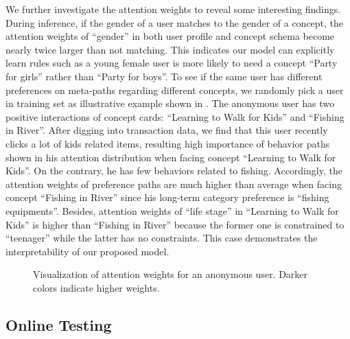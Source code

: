 We further investigate the attention weights to reveal some interesting findings.
During inference, if the gender of a user matches to the gender of a concept, the attention weights of ``gender'' in both user profile and concept schema become nearly twice larger than not matching.
This indicates our model can explicitly learn rules such as a young female user is more likely to need a concept ``Party for girls'' rather than ``Party for boys''.
To see if the same user has different preferences on meta-paths regarding different concepts, we randomly pick a user in training set as illustrative example shown in .
The anonymous user has two positive interactions of concept cards: ``Learning to Walk for Kids'' and ``Fishing in River''.
After digging into transaction data,
we find that this user recently clicks a lot of kids related items, resulting high importance of behavior paths shown in his attention distribution when facing concept ``Learning to Walk for Kids''.
On the contrary, he has few behaviors related to fishing. 
Accordingly, the attention weights of preference paths are much higher than average when facing concept ``Fishing in River'' since his long-term category preference is ``fishing equipments''.
Besides, attention weights of ``life stage'' in ``Learning to Walk for Kids'' is higher than ``Fishing in River'' because the former one is constrained to ``teenager'' while the latter has no constraints.
This case demonstrates the interpretability of our proposed model.

\begin{figure}[th]
	\centering
	\caption{Visualization of attention weights for an anonymous user. Darker colors indicate higher weights.}
	\label{fig:att2}
\end{figure}

\subsection{Online Testing}

